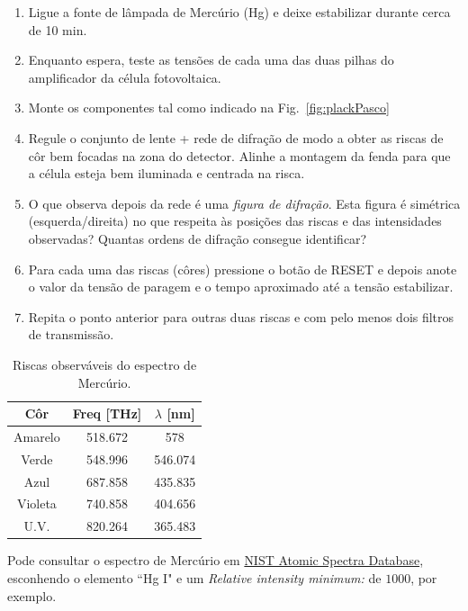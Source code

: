 \documentclass[a4paper,12pt]{article}  %
\begin{document}
\begin{enumerate}
\item Ligue a fonte de lâmpada de Mercúrio (Hg) e deixe estabilizar durante cerca de 10 min.
\item Enquanto espera, teste as tensões de cada uma das duas pilhas do amplificador da célula fotovoltaica.
\item Monte os componentes tal como indicado na Fig.~\ref{fig:plackPasco}
\item Regule o conjunto de lente + rede de difração de modo a obter as riscas de côr bem focadas na zona do detector. Alinhe a montagem da fenda para que a célula esteja bem iluminada e centrada na risca.
\item O que observa depois da rede é uma \emph{figura de difração}. 
Esta figura é simétrica (esquerda/direita) no que respeita às posições das riscas e das intensidades observadas? Quantas ordens de difração consegue identificar?
\item Para cada uma das riscas (côres) pressione o botão de RESET e depois anote o valor da tensão de paragem e o tempo aproximado até a tensão estabilizar.
\item Repita o ponto anterior para outras duas riscas  e com pelo menos dois filtros de transmissão.
\end{enumerate}


\begin{table}[!hbp]
\begin{center}
	\begin{tabular}{|c|c|c|}
	\hline
	Côr  & Freq [THz] & $\lambda$ [nm]  \\
	\hline
	Amarelo & 518.672 & 578 \\
	Verde & 548.996 & 546.074\\
	Azul & 687.858  & 435.835 \\
	Violeta & 740.858  & 404.656\\
	U.V.    & 820.264  & 365.483 \\
	\hline
 	\end{tabular}
	\caption{Riscas observáveis do espectro de Mercúrio.} 
	\label{tab:Hg}
	\end{center}
\end{table}

Pode consultar o espectro de Mercúrio em  \href{http://physics.nist.gov/asd}{
NIST Atomic Spectra Database}, esconhendo o elemento ``Hg I" e um \emph{Relative intensity minimum:} de $1000$, por exemplo. 	  	



\end{document}

